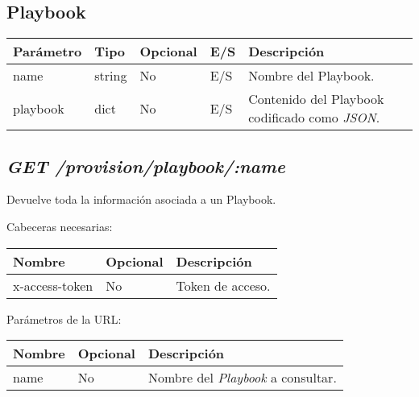 	\subsection{Playbook}
	\label{sec:playbook}
		\begin{table}[h!]
			\centering
	\begin{adjustbox}{max width=\textwidth}
			\begin{tabularx}{\linewidth}{|l|l|l|l|L|}
				\hline
				Parámetro & Tipo & Opcional & E/S & Descripción \\ \hline
				name & string & No & E/S & Nombre del Playbook. \\ \hline
				playbook & dict & No & E/S & Contenido del Playbook codificado como \textit{JSON}. \\ \hline
			\end{tabularx}
\end{adjustbox}
		\end{table}
	
	\subsection{\textit{GET /provision/playbook/:name}}
		Devuelve toda la información asociada a un Playbook.
		
		Cabeceras necesarias:
		\begin{table}[h!]
			\centering
	\begin{adjustbox}{max width=\textwidth}
			\begin{tabular}{|l|l|l|}
				\hline
				Nombre & Opcional & Descripción \\ \hline
				x-access-token & No & Token de acceso. \\ \hline
			\end{tabular}
\end{adjustbox}
		\end{table}
		
		Parámetros de la URL:
		\begin{table}[h!]
			\centering
	\begin{adjustbox}{max width=\textwidth}
			\begin{tabular}{|l|l|l|}
				\hline
				Nombre & Opcional & Descripción \\ \hline
				name & No & Nombre del \textit{Playbook} a consultar. \\ \hline
			\end{tabular}
\end{adjustbox}
		\end{table}
		
